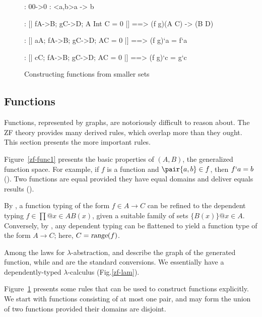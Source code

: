 \begin{figure}
\begin{alltt*}\isastyleminor
{}:           0\isasymin{}0->0
:          {\ttlbrace}<a,b>{\ttrbrace}\isasymin{}{\ttlbrace}a{\ttrbrace} -> {\ttlbrace}b{\ttrbrace}

:     [| f\isasymin{}A->B; g\isasymin{}C->D; A Int C = 0  |] ==>  
                     (f \isasymunion g)\isasymin{}(A \isasymunion C) -> (B \isasymunion D)

: [| a\isasymin{}A; f\isasymin{}A->B; g\isasymin{}C->D;  A\isasyminter{}C = 0 |] ==>  
                     (f \isasymunion g)`a = f`a

: [| c\isasymin{}C; f\isasymin{}A->B; g\isasymin{}C->D;  A\isasyminter{}C = 0 |] ==>  
                     (f \isasymunion g)`c = g`c
\end{alltt*}
\caption{Constructing functions from smaller sets} \label{zf-func2}
\end{figure}


\subsection{Functions}
Functions, represented by graphs, are notoriously difficult to reason
about.  The ZF theory provides many derived rules, which overlap more
than they ought.  This section presents the more important rules.

Figure~\ref{zf-func1} presents the basic properties of $(A,B)$,
the generalized function space.  For example, if $f$ is a function and
$\pair{a,b}\in f$, then $f`a=b$ ().  Two functions
are equal provided they have equal domains and deliver equals results
().

By , a function typing of the form $f\in A\to C$ can be
refined to the dependent typing $f\in\prod@{x\in A}B(x)$, given a suitable
family of sets $\{B(x)\}@{x\in A}$.  Conversely, by ,
any dependent typing can be flattened to yield a function type of the form
$A\to C$; here, $C=\emph{\sl range}(f)$.

Among the laws for $\lambda$-abstraction,  and 
describe the graph of the generated function, while  and
 are the standard conversions.  We essentially have a
dependently-typed $\lambda$-calculus (Fig.\ts\ref{zf-lam}).

Figure~\ref{zf-func2} presents some rules that can be used to construct
functions explicitly.  We start with functions consisting of at most one
pair, and may form the union of two functions provided their domains are
disjoint.  


